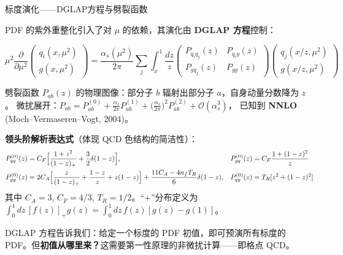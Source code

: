 \documentclass[10pt,aspectratio=169]{beamer}
\begin{document}
\begin{frame}{标度演化——DGLAP方程与劈裂函数}

  PDF 的紫外重整化引入了对 $\mu$ 的依赖，其演化由 \textbf{DGLAP 方程}控制：

  \begin{equation}
    \boxed{
      \mu^2 \frac{\partial}{\partial \mu^2}
      \begin{pmatrix} q_i(x,\mu^2) \\[2pt] g(x,\mu^2) \end{pmatrix}
      = \frac{\alpha_s(\mu^2)}{2\pi}
      \sum_{j} \int_x^1 \frac{dz}{z}
      \begin{pmatrix}
        P_{q_i q_j}(z) & P_{q_i g}(z) \\[4pt]
        P_{g q_j}(z)  & P_{g g}(z)
      \end{pmatrix}
      \begin{pmatrix} q_j(x/z,\mu^2) \\[2pt] g(x/z,\mu^2) \end{pmatrix}
    }
  \end{equation}

  劈裂函数 $P_{ab}(z)$ 的物理图像：部分子 $b$ 辐射出部分子 $a$，自身动量分数降为 $z$。
  微扰展开：$P_{ab} = P_{ab}^{(0)} + \frac{\alpha_s}{2\pi}P_{ab}^{(1)} + \bigl(\frac{\alpha_s}{2\pi}\bigr)^2 P_{ab}^{(2)} + \mathcal{O}(\alpha_s^3)$，
  已知到 \textbf{NNLO} (Moch--Vermaseren--Vogt, 2004)。

  \textbf{领头阶解析表达式}（体现 QCD 色结构的简洁性）：
  {\small
  \begin{align*}
    P_{qq}^{(0)}(z) &= C_F\Bigl[\frac{1+z^2}{(1-z)_+}+\frac{3}{2}\delta(1-z)\Bigr], &
    P_{gq}^{(0)}(z) &= C_F\frac{1+(1-z)^2}{z} \\
    P_{gg}^{(0)}(z) &= 2C_A\Bigl[\frac{z}{(1-z)_+}+\frac{1-z}{z}+z(1-z)\Bigr]
                       +\frac{11C_A-4n_f T_R}{6}\delta(1-z), &
    P_{qg}^{(0)}(z) &= T_R[z^2+(1-z)^2]
  \end{align*}}
  其中 $C_A=3$, $C_F=4/3$, $T_R=1/2$。``$+$''分布定义为
  {\small $\int_0^1 dz\,[f(z)]_+ g(z) = \int_0^1 dz\,f(z)[g(z)-g(1)]$}。

  DGLAP 方程告诉我们：给定一个标度的 PDF 初值，即可预演所有标度的 PDF。但\textbf{初值从哪里来？}这需要第一性原理的非微扰计算——即格点 QCD。
\end{frame}
\end{document}
